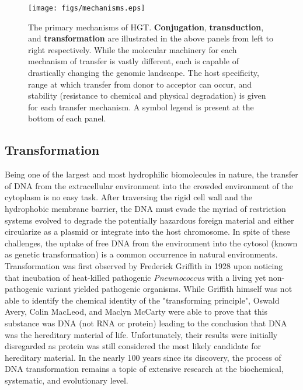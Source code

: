 \begin{figure}
\centerline{\texttt{[image: figs/mechanisms.eps]}}

\caption{The primary mechanisms of HGT. \textbf{Conjugation},
\textbf{transduction}, and \textbf{transformation} are illustrated in the above
panels from left to right respectively. While the molecular machinery for each
mechanism of transfer is vastly different, each is capable of drastically
changing the genomic landscape. The host specificity, range at which transfer
from donor to acceptor can occur, and stability (resistance to chemical and physical
degradation) is given for each transfer mechanism. A symbol legend is present at the bottom of each panel.}

\label{fig:mechanisms}
\end{figure}


\subsection*{Transformation}
Being one of the largest and most hydrophilic biomolecules in nature, the
transfer of DNA from the extracellular environment into the crowded environment of the
cytoplasm is no easy task. After traversing the rigid cell wall and the
hydrophobic membrane barrier, the DNA must evade the myriad of
restriction systems evolved to degrade the potentially hazardous foreign
material and either circularize as a plasmid or integrate into the host
chromosome. In spite of these challenges, the uptake of free DNA from the
environment into the cytosol (known as genetic transformation) is a common
occurrence in natural environments. Transformation was first observed by
Frederick Griffith in 1928 \cite{Griffith:1928vg} upon noticing that incubation
of heat-killed pathogenic \textit{Pneumococcus} with a living yet non-pathogenic
variant yielded pathogenic organisms. While Griffith himself was not able to
identify the chemical identity of the "transforming principle", Oswald Avery,
Colin MacLeod, and Maclyn McCarty were able to prove that this substance was DNA
(not RNA or protein) \cite{Avery:2014wx} leading to the conclusion that DNA was
the hereditary material of life. Unfortunately, their results were initially
disregarded as protein was still considered the most likely candidate for
hereditary material. In the nearly 100 years since its discovery, the process of
DNA transformation remains a topic of extensive research at the biochemical,
systematic, and evolutionary level.

